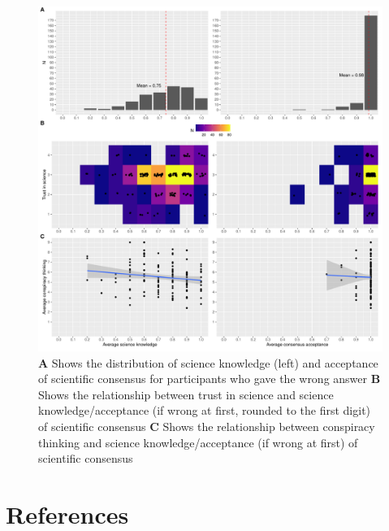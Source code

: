 \documentclass[
  doc,floatsintext]{apa6}
\begin{document}
\begin{figure}
\centering
\includegraphics{output/figures/exp3-plot.pdf}
\caption{\label{fig:exp3-plot}\textbf{A} Shows the distribution of science knowledge (left) and acceptance of scientific consensus for participants who gave the wrong answer \textbf{B} Shows the relationship between trust in science and science knowledge/acceptance (if wrong at first, rounded to the first digit) of scientific consensus \textbf{C} Shows the relationship between conspiracy thinking and science knowledge/acceptance (if wrong at first) of scientific consensus}
\end{figure}

\FloatBarrier

\section{References}\label{references}
\end{document}
